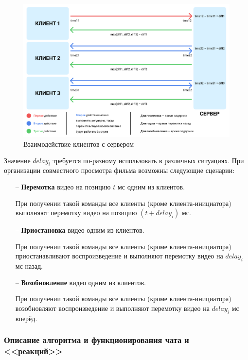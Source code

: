 \documentclass{../includes/TechDoc}
\begin{document}
    \begin{figure}[h]
        \centering
        \includegraphics[width=1\linewidth]{images/interaction_format.png}
        \caption{Взаимодействие клиентов с сервером}
        \label{fig:interaction_format}
    \end{figure}

    Значение \(delay_i\) требуется по-разному использовать в различных ситуациях.
    При организации совместного просмотра фильма возможны следующие сценарии:
    \begin{itemize}
        \item[--] \textbf{Перемотка} видео на позицию \(t\) мс одним из клиентов.

        При получении такой команды все клиенты (кроме клиента-инициатора) выполняют перемотку видео на позицию \((t + delay_i)\) мс.
        \item[--] \textbf{Приостановка} видео одним из клиентов.

        При получении такой команды все клиенты (кроме клиента-инициатора) приостанавливают воспроизведение и выполняют перемотку видео на \(delay_i\) мс назад.
        \item[--] \textbf{Возобновление} видео одним из клиентов.

        При получении такой команды все клиенты (кроме клиента-инициатора) возобновляют воспроизведение и выполняют перемотку видео на \(delay_i\) мс вперёд.
    \end{itemize}

    \subsubsection{Описание алгоритма и функционирования чата и <<реакций>>}
\end{document}
